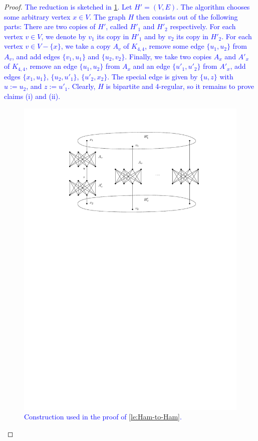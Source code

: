 \documentclass[runningheads]{llncs}
\newcommand{\set}[1]{\{ #1 \}}
\newcommand{\lasse}[1]{\textcolor{blue}{#1}}
\begin{document}
\begin{proof}
\lasse{
The reduction is sketched in \cref{fig_hamilton_cycle_lemma}. Let $H' = (V, E)$. The algorithm chooses some arbitrary vertex $x \in V$. The graph $H$ then consists out of the following parts: There are two copies of $H'$, called $H'_1$ and $H'_2$ respectively. For each vertex $v \in V$, we denote by $v_1$ its copy in $H'_1$ and by $v_2$ its copy in $H'_2$. For each vertex $v \in V-\set{x}$, we take a copy $A_v$ of $K_{4,4}$, remove some edge $\set{u_1, u_2}$ from $A_v$, and add edges $\set{v_1,u_1}$ and $\set{u_2,v_2}$. Finally, we take two copies $A_x$ and $A'_x$ of $K_{4,4}$, remove an edge $\set{u_1,u_2}$ from $A_x$ and an edge $\set{u'_1,u'_2}$ from $A'_x$, add edges $\set{x_1,u_1}$, $\set{u_2,u'_1}$, $\set{u'_2,x_2}$. The special edge is given by $\set{u, z}$ with $u := u_2$, and $z := u'_1$. Clearly, $H$ is bipartite and 4-regular, so it remains to prove claims (i) and (ii).
}
\begin{figure}[htpb]
\centering
\includegraphics[scale=0.92]{img/hamilton-prime}
\caption{\lasse{Construction used in the proof of \cref{le:Ham-to-Ham}.}}
\label{fig_hamilton_cycle_lemma}
\end{figure}


\end{proof}
\end{document}
